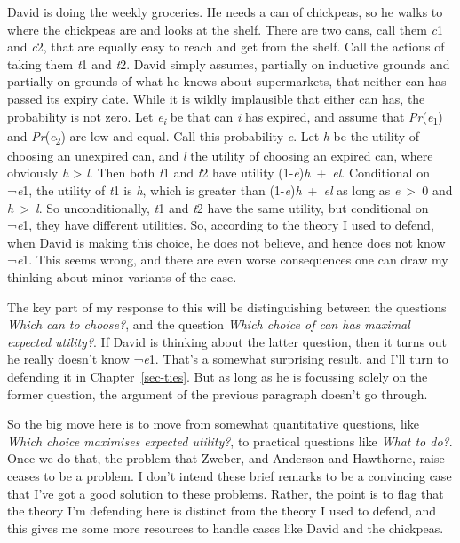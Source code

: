 \documentclass[
  10pt,
  letterpaper,
  twoside]{scrbook}
\begin{document}
David is doing the weekly groceries. He needs a can of chickpeas, so he
walks to where the chickpeas are and looks at the shelf. There are two
cans, call them \emph{c}1 and \emph{c}2, that are equally easy to reach
and get from the shelf. Call the actions of taking them \emph{t}1 and
\emph{t}2. David simply assumes, partially on inductive grounds and
partially on grounds of what he knows about supermarkets, that neither
can has passed its expiry date. While it is wildly implausible that
either can has, the probability is not zero. Let
\emph{e\textsubscript{i}} be that can \emph{i} has expired, and assume
that \emph{Pr}(\emph{e}\textsubscript{1}) and
\emph{Pr}(\emph{e}\textsubscript{2}) are low and equal. Call this
probability \emph{e}. Let \emph{h} be the utility of choosing an
unexpired can, and \emph{l} the utility of choosing an expired can,
where obviously \emph{h} \textgreater{} \emph{l}. Then both \emph{t}1
and \emph{t}2 have utility (1-\emph{e})\emph{h}~+~\emph{el}. Conditional
on ¬\emph{e}1, the utility of \emph{t}1 is \emph{h}, which is greater
than (1-\emph{e})\emph{h}~+~\emph{el} as long as \emph{e}~\textgreater~0
and \emph{h}~\textgreater~\emph{l}. So unconditionally, \emph{t}1 and
\emph{t}2 have the same utility, but conditional on ¬\emph{e}1, they
have different utilities. So, according to the theory I used to defend,
when David is making this choice, he does not believe, and hence does
not know ¬\emph{e}1. This seems wrong, and there are even worse
consequences one can draw my thinking about minor variants of the case.

The key part of my response to this will be distinguishing between the
questions \emph{Which can to choose?}, and the question \emph{Which
choice of can has maximal expected utility?}. If David is thinking about
the latter question, then it turns out he really doesn't know
¬\emph{e}1. That's a somewhat surprising result, and I'll turn to
defending it in Chapter~\ref{sec-ties}. But as long as he is focussing
solely on the former question, the argument of the previous paragraph
doesn't go through.

So the big move here is to move from somewhat quantitative questions,
like \emph{Which choice maximises expected utility?}, to practical
questions like \emph{What to do?}. Once we do that, the problem that
Zweber, and Anderson and Hawthorne, raise ceases to be a problem. I
don't intend these brief remarks to be a convincing case that I've got a
good solution to these problems. Rather, the point is to flag that the
theory I'm defending here is distinct from the theory I used to defend,
and this gives me some more resources to handle cases like David and the
chickpeas.
\end{document}
